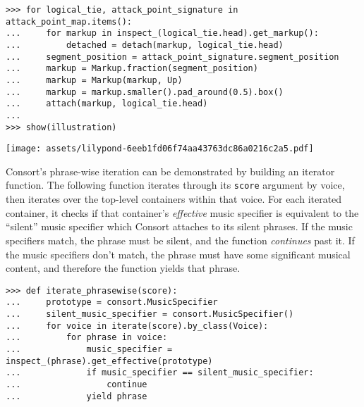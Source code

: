 \begin{abjadbookoutput}
\begin{singlespacing}
\vspace{-0.5\baselineskip}
\begin{lstlisting}
>>> for logical_tie, attack_point_signature in attack_point_map.items():
...     for markup in inspect_(logical_tie.head).get_markup():
...         detached = detach(markup, logical_tie.head)
...     segment_position = attack_point_signature.segment_position
...     markup = Markup.fraction(segment_position)
...     markup = Markup(markup, Up)
...     markup = markup.smaller().pad_around(0.5).box()
...     attach(markup, logical_tie.head)
...
>>> show(illustration)
\end{lstlisting}
\noindent\texttt{[image: assets/lilypond-6eeb1fd06f74aa43763dc86a0216c2a5.pdf]}
\end{singlespacing}
\end{abjadbookoutput}

\noindent Consort's phrase-wise iteration can be demonstrated by building an
iterator function. The following function iterates through its \texttt{score}
argument by voice, then iterates over the top-level containers within that
voice. For each iterated container, it checks if that container's
\emph{effective} music specifier is equivalent to the \enquote{silent} music
specifier which Consort attaches to its silent phrases. If the music specifiers
match, the phrase must be silent, and the function \emph{continues} past it. If
the music specifiers don't match, the phrase must have some significant musical
content, and therefore the function yields that phrase.

\begin{comment}
<abjad>[stylesheet=../consort.ily]
def iterate_phrasewise(score):
    prototype = consort.MusicSpecifier
    silent_music_specifier = consort.MusicSpecifier()
    for voice in iterate(score).by_class(Voice):
        for phrase in voice:
            music_specifier = inspect_(phrase).get_effective(prototype)
            if music_specifier == silent_music_specifier:
                continue
            yield phrase
</abjad>
\end{comment}

\begin{abjadbookoutput}
\begin{singlespacing}
\vspace{-0.5\baselineskip}
\begin{lstlisting}
>>> def iterate_phrasewise(score):
...     prototype = consort.MusicSpecifier
...     silent_music_specifier = consort.MusicSpecifier()
...     for voice in iterate(score).by_class(Voice):
...         for phrase in voice:
...             music_specifier = inspect_(phrase).get_effective(prototype)
...             if music_specifier == silent_music_specifier:
...                 continue
...             yield phrase
\end{lstlisting}
\end{singlespacing}
\end{abjadbookoutput}

